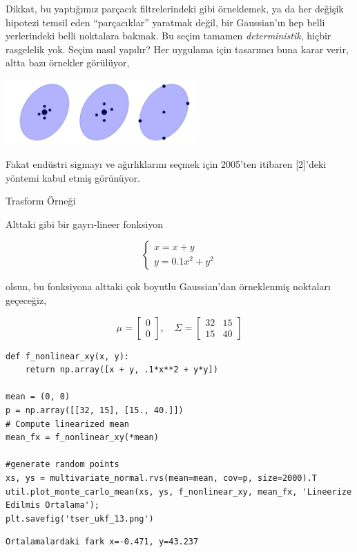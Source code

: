 \documentclass[12pt,fleqn]{article}\usepackage{../../common}
\begin{document}
Dikkat, bu yaptığımız parçacık filtrelerindeki gibi örneklemek, ya da her
değişik hipotezi temsil eden ``parçacıklar'' yaratmak değil, bir
Gaussian'ın hep belli yerlerindeki belli noktalara bakmak. Bu seçim tamamen
{\em deterministik}, hiçbir rasgelelik yok. Seçim nasıl yapılır?  Her
uygulama için tasarımcı buna karar verir, altta bazı örnekler görülüyor,

\includegraphics[height=2.5cm]{tser_ukf_03.png}

Fakat endüstri sigmayı ve ağırlıklarını seçmek için 2005'ten itibaren
[2]'deki yöntemi kabul etmiş görünüyor.

Trasform Örneği

Alttaki gibi bir gayrı-lineer fonksiyon

$$ 
\left\{ \begin{array}{ll}
x = x + y \\
y = 0.1 x^2 + y^2
\end{array} \right.
$$

olsun, bu fonksiyona  alttaki çok boyutlu Gaussian'dan örneklenmiş
noktaları geçeceğiz, 

$$ 
\mu = \left[\begin{array}{r} 0 \\ 0 \end{array}\right],
\quad 
\Sigma = \left[\begin{array}{rr} 32 & 15 \\ 15 & 40 \end{array}\right]
$$

\begin{verbatim}
def f_nonlinear_xy(x, y):
    return np.array([x + y, .1*x**2 + y*y])

mean = (0, 0)
p = np.array([[32, 15], [15., 40.]])
# Compute linearized mean
mean_fx = f_nonlinear_xy(*mean)

#generate random points
xs, ys = multivariate_normal.rvs(mean=mean, cov=p, size=2000).T
util.plot_monte_carlo_mean(xs, ys, f_nonlinear_xy, mean_fx, 'Lineerize Edilmis Ortalama');
plt.savefig('tser_ukf_13.png')
\end{verbatim}

\begin{verbatim}
Ortalamalardaki fark x=-0.471, y=43.237
\end{verbatim}
\end{document}
